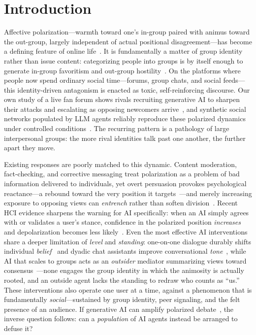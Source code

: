 
\section{Introduction}
\label{sec:intro}

Affective polarization---warmth toward one's in-group paired with animus toward
the out-group, largely independent of actual positional disagreement---has become
a defining feature of online life~\cite{iyengar2015fear,iyengar2019origins}. It is
fundamentally a matter of group identity rather than issue content: categorizing
people into groups is by itself enough to generate in-group favoritism and
out-group hostility~\cite{tajfel1979sit}. On the platforms where people now spend
ordinary social time---forums, group chats, and social feeds---this identity-driven
antagonism is enacted as toxic, self-reinforcing discourse. Our own study of a live
fan forum shows rivals recruiting generative AI to sharpen their attacks and
escalating as opposing newcomers arrive~\cite{zeng2025ronaldo}, and synthetic
social networks populated by LLM agents reliably reproduce these polarized dynamics
under controlled conditions~\cite{donkers2025synthetic}. The recurring pattern is a
pathology of large interpersonal groups: the more rival identities talk past one
another, the further apart they move.

Existing responses are poorly matched to this dynamic. Content moderation,
fact-checking, and corrective messaging treat polarization as a problem of bad
information delivered to individuals, yet overt persuasion provokes psychological
reactance---a rebound toward the very position it targets~\cite{brehm1966reactance}---and
merely increasing exposure to opposing views can \emph{entrench} rather than soften
division~\cite{bail2018exposure}. Recent HCI evidence sharpens the warning for AI
specifically: when an AI simply agrees with or validates a user's stance, confidence
in the polarized position \emph{increases} and depolarization becomes less
likely~\cite{whenaiagrees2026}. Even the most effective AI interventions share a
deeper limitation of \emph{level} and \emph{standing}: one-on-one dialogue durably
shifts individual \emph{belief}~\cite{costello2024durably} and dyadic chat assistants
improve conversational \emph{tone}~\cite{argyle2023chat}, while AI that scales to
groups acts as an \emph{outsider} mediator summarizing views toward
consensus~\cite{tessler2024commonground}---none engages the group identity in which
the animosity is actually rooted, and an outside agent lacks the standing to redraw
who counts as ``us.'' These interventions also operate one user at a time, against a
phenomenon that is fundamentally \emph{social}---sustained by group identity, peer
signaling, and the felt presence of an audience. If generative AI can amplify
polarized debate~\cite{zeng2025ronaldo}, the inverse question follows: can a
\emph{population} of AI agents instead be arranged to defuse it?

